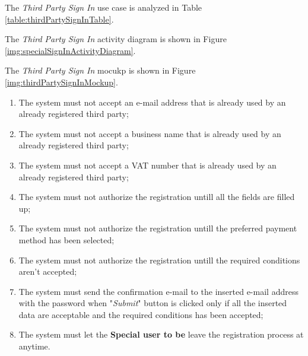 The \textit{Third Party Sign In} use case is analyzed in Table \ref{table:thirdPartySignInTable}.

The \textit{Third Party Sign In} activity diagram is shown in Figure \ref{img:specialSignInActivityDiagram}.

The \textit{Third Party Sign In} mocukp is shown in Figure \ref{img:thirdPartySignInMockup}.

\begin{enumerate}
  \item The system must not accept an e-mail address that is already used by an already registered third party;
  \item The system must not accept a business name that is already used by an already registered third party;
  \item The system must not accept a VAT number that is already used by an already registered third party;
  \item The system must not authorize the registration untill all the fields are filled up;
  \item The system must not authorize the registration untill the preferred payment method has been selected;
  \item The system must not authorize the registration untill the required conditions aren't accepted;
  \item The system must send the confirmation e-mail to the inserted e-mail address with the password when "\textit{Submit}" button is clicked only if all the inserted data are acceptable and the required conditions has been accepted;
  \item The system must let the \textbf{Special user to be} leave the registration process at anytime.
\end{enumerate}

